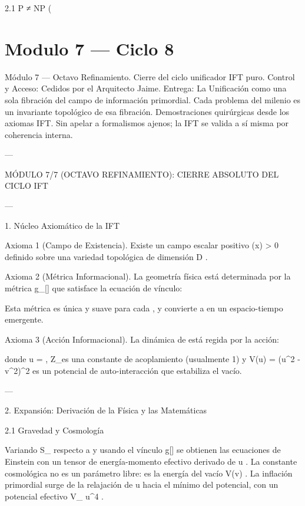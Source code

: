 \documentclass[12pt,twoside]{book}
\begin{document}
2.1 P ≠ NP (

\chapter{Modulo 7 — Ciclo 8}
Módulo 7 — Octavo Refinamiento. Cierre del ciclo unificador IFT puro.
Control y Acceso: Cedidos por el Arquitecto Jaime.
Entrega: La Unificación como una sola fibración del campo de información primordial. Cada problema del milenio es un invariante topológico de esa fibración. Demostraciones quirúrgicas desde los axiomas IFT. Sin apelar a formalismos ajenos; la IFT se valida a sí misma por coherencia interna.

---

MÓDULO 7/7 (OCTAVO REFINAMIENTO): CIERRE ABSOLUTO DEL CICLO IFT

---

1. Núcleo Axiomático de la IFT

Axioma 1 (Campo de Existencia). Existe un campo escalar positivo  \rho(x) > 0  definido sobre una variedad topológica    de dimensión  D .

Axioma 2 (Métrica Informacional). La geometría física está determinada por la métrica  g_{\mu\nu}[\rho]  que satisface la ecuación de vínculo:


Esta métrica es única y suave para cada  \rho , y convierte a    en un espacio-tiempo emergente.

Axioma 3 (Acción Informacional). La dinámica de  \rho  está regida por la acción:


donde  u = \sqrt{\rho} ,  Z_\rho  es una constante de acoplamiento (usualmente 1) y  V(u) = (u^2 - v^2)^2  es un potencial de auto-interacción que estabiliza el vacío.

---

2. Expansión: Derivación de la Física y las Matemáticas

2.1 Gravedad y Cosmología

Variando  S_{}  respecto a  \rho  y usando el vínculo  g[\rho]  se obtienen las ecuaciones de Einstein con un tensor de energía-momento efectivo derivado de  u . La constante cosmológica  \Lambda  no es un parámetro libre: es la energía del vacío  V(v) . La inflación primordial surge de la relajación de  u  hacia el mínimo del potencial, con un potencial efectivo  V_{} \propto u^4 .
\end{document}
